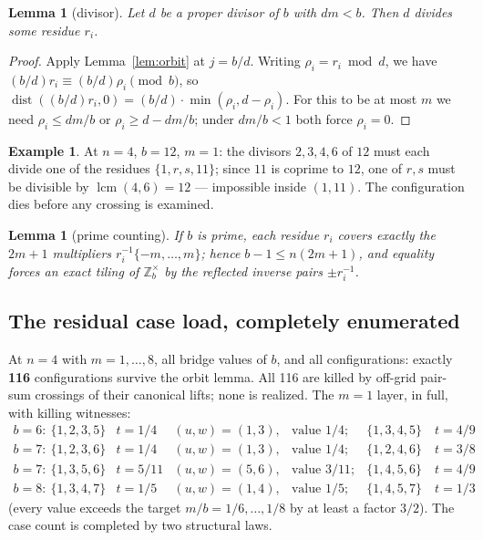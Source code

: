 \documentclass[11pt,a4paper]{article}
\theoremstyle{plain}
\newtheorem{lemma}[theorem]{Lemma}
\theoremstyle{definition}
\newtheorem{example}[theorem]{Example}
\theoremstyle{remark}
\newcommand{\dist}{\operatorname{dist}}
\newcommand{\Z}{\mathbb{Z}}
\begin{document}
\begin{lemma}[divisor]\label{lem:divisor}
Let $d$ be a proper divisor of $b$ with $dm < b$. Then $d$ divides some residue $r_i$.
\end{lemma}

\begin{proof}
Apply Lemma~\ref{lem:orbit} at $j = b/d$. Writing $\rho_i = r_i \bmod d$, we have
$(b/d) r_i \equiv (b/d)\rho_i \pmod b$, so $\dist((b/d) r_i, 0) = (b/d) \cdot
\min(\rho_i, d - \rho_i)$. For this to be at most $m$ we need
$\rho_i \le dm/b$ or $\rho_i \ge d - dm/b$; under $dm/b < 1$ both force $\rho_i = 0$.
\end{proof}

\begin{example}
At $n = 4$, $b = 12$, $m = 1$: the divisors $2, 3, 4, 6$ of $12$ must each divide one of
the residues $\{1, r, s, 11\}$; since $11$ is coprime to $12$, one of $r, s$ must be
divisible by $\operatorname{lcm}(4, 6) = 12$ --- impossible inside $(1, 11)$. The
configuration dies before any crossing is examined.
\end{example}

\begin{lemma}[prime counting]\label{lem:prime}
If $b$ is prime, each residue $r_i$ covers exactly the $2m+1$ multipliers
$r_i^{-1}\{-m, \dots, m\}$; hence $b - 1 \le n(2m+1)$, and equality forces an exact
tiling of $\Z_b^{\times}$ by the reflected inverse pairs $\pm r_i^{-1}$.
\end{lemma}

\subsection{The residual case load, completely enumerated}

At $n = 4$ with $m = 1, \dots, 8$, all bridge values of $b$, and all configurations:
exactly \textbf{116} configurations survive the orbit lemma. All 116 are killed by
off-grid pair-sum crossings of their canonical lifts; none is realized. The $m = 1$
layer, in full, with killing witnesses:
\[
\begin{array}{lllll}
b=6:\ \{1,2,3,5\} & t = 1/4 & (u,w) = (1,3), & \text{value } 1/4; &
\{1,3,4,5\} \quad t = 4/9 \\
b=7:\ \{1,2,3,6\} & t = 1/4 & (u,w) = (1,3), & \text{value } 1/4; &
\{1,2,4,6\} \quad t = 3/8 \\
b=7:\ \{1,3,5,6\} & t = 5/11 & (u,w) = (5,6), & \text{value } 3/11; &
\{1,4,5,6\} \quad t = 4/9 \\
b=8:\ \{1,3,4,7\} & t = 1/5 & (u,w) = (1,4), & \text{value } 1/5; &
\{1,4,5,7\} \quad t = 1/3
\end{array}
\]
(every value exceeds the target $m/b = 1/6, \dots, 1/8$ by at least a factor
$3/2$). The case count is completed by two structural laws.
\end{document}
